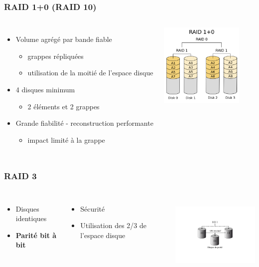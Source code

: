 \begin{frame}
\frametitle{RAID 1+0 (RAID 10)}
\begin{columns}
  \begin{itemize}
    \item Volume agrégé par bande fiable
    \begin{itemize}
      \item grappes répliquées
      \item utilisation de la moitié de l'espace disque
    \end{itemize}
    \item 4 disques minimum
    \begin{itemize}
      \item 2 éléments et 2 grappes
    \end{itemize}
    \item Grande fiabilité - reconstruction performante
    \begin{itemize}
      \item impact limité à la grappe
    \end{itemize}
  \end{itemize}
  \includegraphics[height=4cm]{../illustration/RAID10.png}
\end{columns}


\end{frame}




\begin{frame}
\frametitle{RAID 3}
\begin{columns}
\begin{itemize}
\item Disques identiques
\item \textbf{Parité bit à bit}
\end{itemize}
\begin{itemize}
\item Sécurité
\item Utilisation des 2/3 de l’espace disque
\end{itemize}
\includegraphics[height=4cm]{../illustration/RAID3.pdf}
\end{columns}
\end{frame}


